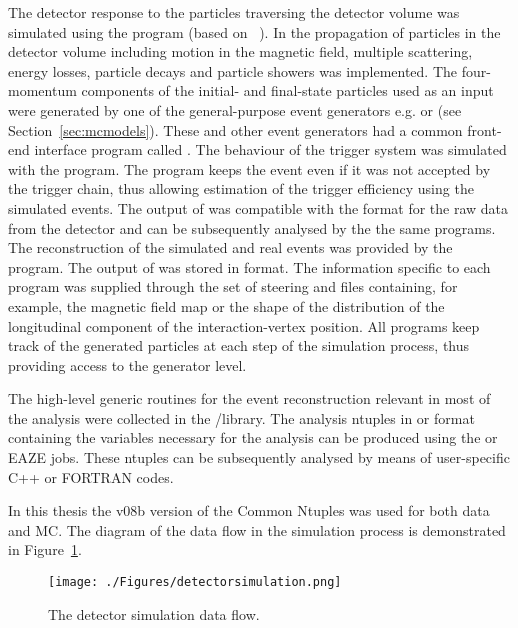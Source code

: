 The detector response to the particles traversing the detector volume was simulated using the \mozart program (based on ~\cite{tech:cern-dd-ee-84-1}). In \mozart the propagation of particles in the detector volume including motion in the magnetic field, multiple scattering, energy losses, particle decays and particle showers was implemented. The four-momentum components of the initial- and final-state particles used as an input were generated by one of the general-purpose event generators e.g. \lepto or \ariadne (see Section~\ref{sec:mcmodels}). These and other event generators had a common front-end interface program called \amadeus. The behaviour of the trigger system was simulated with the \zgana program. The \zgana program keeps the event even if it was not accepted by the trigger chain, thus allowing estimation of the trigger efficiency using the simulated events. The output of \zgana was compatible with the format for the raw data from the detector and can be subsequently analysed by the the same programs. The reconstruction of the simulated and real events was provided by the \zephyr program. The output of \zephyr was stored in \adamo format. The information specific to each program was supplied through the set of steering and \gaf files containing, for example, the magnetic field map or the shape of the distribution of the longitudinal component of the interaction-vertex position. All programs keep track of the generated particles at each step of the simulation process, thus providing access to the generator level.

The high-level generic routines for the event reconstruction relevant in most of the analysis were collected in the \orange/\phantom library. The analysis ntuples in \paw or \rootpaw format containing the variables necessary for the analysis can be produced using the \orange or EAZE jobs. These ntuples can be subsequently analysed by means of user-specific C++ or FORTRAN codes. 

In this thesis the v08b version of the Common Ntuples was used for both data and MC. The diagram of the data flow in the simulation process is demonstrated in Figure~\ref{fig:detectorsimulation}.

\begin{figure}[p]
	\centering
		\texttt{[image: ./Figures/detectorsimulation.png]}
	\caption{The \zeus detector simulation data flow.}
	\label{fig:detectorsimulation}
\end{figure}
